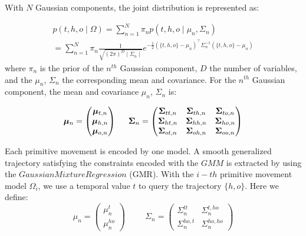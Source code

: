 With $N$ Gaussian components, the joint distribution is represented as:

\begin{equation}
\begin{split}
p\left(t,h,o\mid\Omega\right) = \sum_{n=1}^N \pi_n p\left(t,h,o\mid\mu_n,\Sigma_n\right) \\
= \sum_{n=1}^N \pi_n \frac{1}{\sqrt{\left(2\pi\right)^D \mid\Sigma_n\mid }} e^{-\frac{1}{2}\left(\{t,h,o\}-\mu_n\right)^{\top} \Sigma^{-1}_n \left(\{t,h,o\}-\mu_n\right)}
\end{split}
\end{equation}
where $\pi_n$ is the prior of the $n^{th}$ Gaussian component, $D$ the number of variables,
and the ${\mu}_n$, ${\Sigma}_n$ the corresponding mean and covariance. For the $n^{th}$ Gaussian component, the mean and covariance $\mu_n$, $\Sigma_n$ is:

\begin{equation}
{
\boldsymbol{\mu}_n = \begin{pmatrix}    \boldsymbol{\mu}_{t,n}     \\
                                        \boldsymbol{\mu}_{h,n}          \\
                                        \boldsymbol{\mu}_{o,n}
                    \end{pmatrix}
\hspace{0.2in}
\boldsymbol{\Sigma}_n = \begin{pmatrix}     \boldsymbol{\Sigma}_{tt,n}  & \boldsymbol{\Sigma}_{th,n} & \boldsymbol{\Sigma}_{to,n}  \\
                                            \boldsymbol{\Sigma}_{ht,n}  & \boldsymbol{\Sigma}_{hh,n}  & \boldsymbol{\Sigma}_{ho,n} \\
                                            \boldsymbol{\Sigma}_{ot,n}   & \boldsymbol{\Sigma}_{oh,n}   & \boldsymbol{\Sigma}_{oo,n}
                        \end{pmatrix}
}
\end{equation}

Each primitive movement is encoded by one model. A smooth generalized trajectory satisfying the constraints encoded with the $GMM$ is extracted by using the $Gaussian Mixture Regression$ (GMR). With the $i-th$ primitive movement model $\Omega_i$, we use a temporal value $t$ to query the trajectory $\{h, o\}$. Here we define:
\begin{equation}
{
 {\mu}_{n} = \begin{pmatrix} {\mu}_{n}^t    \\
                             {\mu}_{n}^{ho}
             \end{pmatrix}
}
\hspace{1cm}
{
{\Sigma}_{n} =  \begin{pmatrix} {\Sigma}_{n}^{tt}  & {\Sigma}_{n}^{t,ho}  \\
                                {\Sigma}_{n}^{ho,t} & {\Sigma}_{n}^{ho,ho}
                \end{pmatrix}
}
\end{equation}

